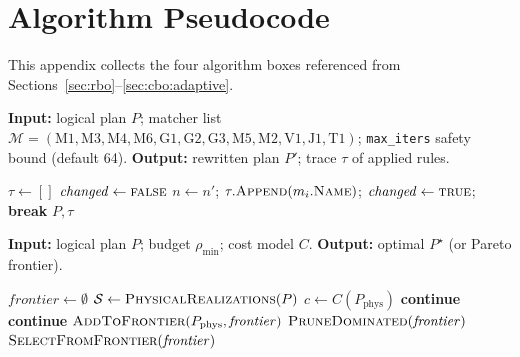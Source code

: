 \documentclass[sigconf]{acmart}
\theoremstyle{plain}
\theoremstyle{definition}
\theoremstyle{remark}
\begin{document}
\section{Algorithm Pseudocode}\label{app:algos}

This appendix collects the four algorithm boxes referenced from
Sections~\ref{sec:rbo}--\ref{sec:cbo:adaptive}.

\begin{algorithm}[t]
\caption{RBO fixed-point loop (A, Section~\ref{sec:rbo:role}).}
\textbf{Input:} logical plan $P$; matcher list
$\mathcal{M} = (\mathrm{M1}, \mathrm{M3}, \mathrm{M4}, \mathrm{M6},
\mathrm{G1}, \mathrm{G2}, \mathrm{G3}, \mathrm{M5}, \mathrm{M2},
\mathrm{V1}, \mathrm{J1}, \mathrm{T1})$;
\texttt{max\_iters} safety bound (default 64).
\textbf{Output:} rewritten plan $P'$; trace $\tau$ of applied rules.
\begin{algorithmic}[1]
  \State $\tau \gets []$
  \Repeat
    \State $\mathit{changed} \gets \textsc{false}$
          \State $n \gets n'$; $\tau.\Call{Append}{m_i.\textsc{Name}}$;
                 $\mathit{changed} \gets \textsc{true}$; \textbf{break}
        \EndIf
      \EndFor
    \EndFor
  \State \Return $P, \tau$
\end{algorithmic}
\end{algorithm}

\begin{algorithm}[t]
\caption{Approximation-aware CBO search (A).}
\textbf{Input:} logical plan $P$; budget $\rho_{\min}$; cost model $C$.
\textbf{Output:} optimal $P^\star$ (or Pareto frontier).
\begin{algorithmic}[1]
  \State $\mathit{frontier} \gets \emptyset$
  \State $\mathcal{S} \gets \Call{PhysicalRealizations}{P}$
    \State $c \gets C(P_{\mathrm{phys}})$
     \State \textbf{continue} \EndIf
      \State \textbf{continue} \EndIf
    \State $\Call{AddToFrontier}{P_{\mathrm{phys}}, \mathit{frontier}}$
    \State $\Call{PruneDominated}{\mathit{frontier}}$
  \EndFor
  \State \Return $\Call{SelectFromFrontier}{\mathit{frontier}}$
\end{algorithmic}
\end{algorithm}
\end{document}
